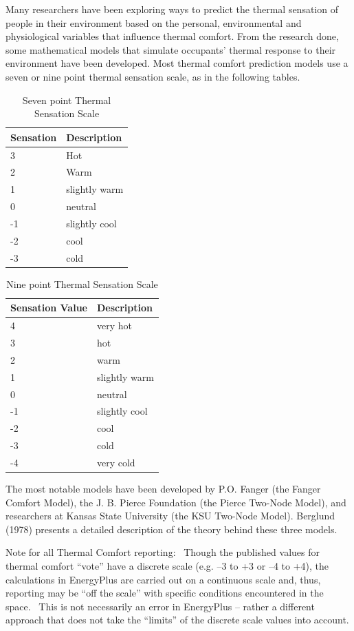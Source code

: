 Many researchers have been exploring ways to predict the thermal sensation of people in their environment based on the personal, environmental and physiological variables that influence thermal comfort. From the research done, some mathematical models that simulate occupants' thermal response to their environment have been developed. Most thermal comfort prediction models use a seven or nine point thermal sensation scale, as in the following tables.

\begin{longtable}[c]{@{}ll@{}}
\caption{  Seven point Thermal Sensation Scale \protect \label{table:seven-point-thermal-sensation-scale}}\\
\toprule 
Sensation & Description \tabularnewline \midrule
\endhead
3 & Hot \tabularnewline
2 & Warm \tabularnewline
1 & slightly warm \tabularnewline
0 & neutral \tabularnewline
-1 & slightly cool \tabularnewline
-2 & cool \tabularnewline
-3 & cold \tabularnewline
\bottomrule
\end{longtable}

\begin{longtable}[c]{@{}ll@{}}
\caption{  Nine point Thermal Sensation Scale \protect \label{table:nine-point-thermal-sensation-scale}}\\
\toprule 
Sensation Value & Description \tabularnewline \midrule
\endhead
4 & very hot \tabularnewline
3 & hot \tabularnewline
2 & warm \tabularnewline
1 & slightly warm \tabularnewline
0 & neutral \tabularnewline
-1 & slightly cool \tabularnewline
-2 & cool \tabularnewline
-3 & cold \tabularnewline
-4 & very cold \tabularnewline
\bottomrule
\end{longtable}

The most notable models have been developed by P.O. Fanger (the Fanger Comfort Model), the J. B. Pierce Foundation (the Pierce Two-Node Model), and researchers at Kansas State University (the KSU Two-Node Model). Berglund (1978) presents a detailed description of the theory behind these three models.

Note for all Thermal Comfort reporting:~ Though the published values for thermal comfort ``vote'' have a discrete scale (e.g. --3 to +3 or --4 to +4), the calculations in EnergyPlus are carried out on a continuous scale and, thus, reporting may be ``off the scale'' with specific conditions encountered in the space.~ This is not necessarily an error in EnergyPlus -- rather a different approach that does not take the ``limits'' of the discrete scale values into account.

